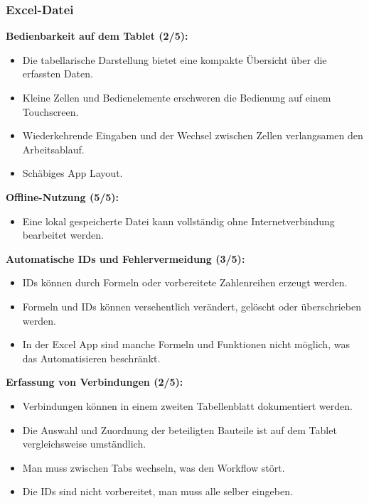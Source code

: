 \newpage
\subsubsection{Excel-Datei}

\textbf{Bedienbarkeit auf dem Tablet (2/5):}
\begin{itemize}[leftmargin=2em, nosep]
    \item[\pluspunkt] Die tabellarische Darstellung bietet eine kompakte
    Übersicht über die erfassten Daten.
    \item[\minuspunkt] Kleine Zellen und Bedienelemente erschweren die
    Bedienung auf einem Touchscreen.
    \item[\minuspunkt] Wiederkehrende Eingaben und der Wechsel zwischen
    Zellen verlangsamen den Arbeitsablauf.
    \item[\minuspunkt]
    Schäbiges App Layout.
\end{itemize}

\medskip
\textbf{Offline-Nutzung (5/5):}
\begin{itemize}[leftmargin=2em, nosep]
    \item[\pluspunkt] Eine lokal gespeicherte Datei kann vollständig ohne
    Internetverbindung bearbeitet werden.
\end{itemize}

\medskip
\textbf{Automatische IDs und Fehlervermeidung (3/5):}
\begin{itemize}[leftmargin=2em, nosep]
    \item[\pluspunkt] IDs können durch Formeln oder vorbereitete
    Zahlenreihen erzeugt werden.
    \item[\minuspunkt] Formeln und IDs können versehentlich verändert,
    gelöscht oder überschrieben werden.
    \item[\minuspunkt]
    In der Excel App sind manche Formeln und Funktionen nicht möglich, was das Automatisieren beschränkt.
\end{itemize}

\medskip
\textbf{Erfassung von Verbindungen (2/5):}
\begin{itemize}[leftmargin=2em, nosep]
    \item[\pluspunkt] Verbindungen können in einem zweiten Tabellenblatt
    dokumentiert werden.
    \item[\minuspunkt] Die Auswahl und Zuordnung der beteiligten Bauteile
    ist auf dem Tablet vergleichsweise umständlich.
    \item[\minuspunkt]
    Man muss zwischen Tabs wechseln, was den Workflow stört.
    \item[\minuspunkt]
    Die IDs sind nicht vorbereitet, man muss alle selber eingeben.
\end{itemize}

